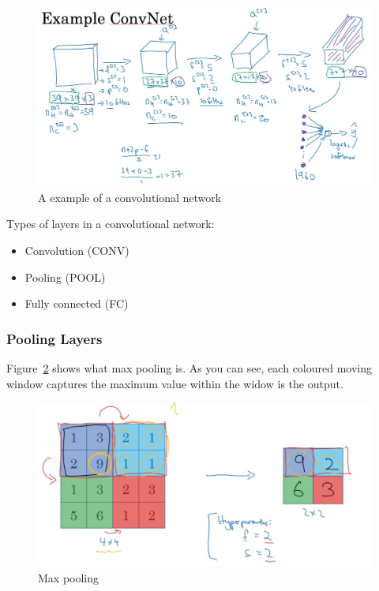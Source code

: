 \documentclass[UTF8]{article}
\begin{document}
\begin{figure}[htb]
    \centering
    \includegraphics[width=40em]{figures/example-of-a-conv-net}
    \caption{A example of a convolutional network}
    \label{fig:example-of-a-conv-layer}
\end{figure}

Types of layers in a convolutional network:
\begin{itemize}
    \item Convolution (CONV)
    \item Pooling (POOL)
    \item Fully connected (FC)
\end{itemize}

\subsubsection{Pooling Layers}
Figure~\ref{fig:max-pooling} shows what max pooling is. As you can see, each coloured moving window
captures the maximum value within the widow is the output.

\begin{figure}[htb]
    \centering
    \includegraphics[width=40em]{figures/max-pooling}
    \caption{Max pooling}
    \label{fig:max-pooling}
\end{figure}
\end{document}
